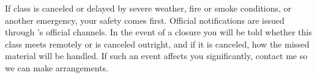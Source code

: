 If class is canceled or delayed by severe weather, fire or smoke conditions, or
another emergency, your safety comes first. Official notifications are issued
through \GetInstitution's official channels. In the event of a closure you will
be told whether this class meets remotely or is canceled outright, and if it is
canceled, how the missed material will be handled. If such an event affects you
significantly, contact me so we can make arrangements.
